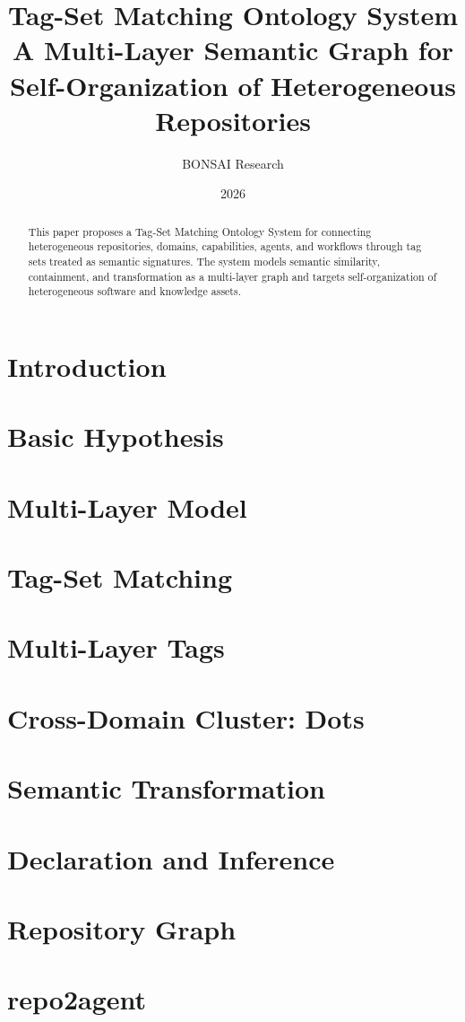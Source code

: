 \documentclass[11pt,a4paper]{article}
\title{Tag-Set Matching Ontology System\\
A Multi-Layer Semantic Graph for Self-Organization of Heterogeneous Repositories}
\author{BONSAI Research}
\date{2026}
\begin{document}
\maketitle

\begin{abstract}
This paper proposes a Tag-Set Matching Ontology System for connecting heterogeneous repositories, domains, capabilities, agents, and workflows through tag sets treated as semantic signatures. The system models semantic similarity, containment, and transformation as a multi-layer graph and targets self-organization of heterogeneous software and knowledge assets.
\end{abstract}

\section{Introduction}
\section{Basic Hypothesis}
\section{Multi-Layer Model}
\section{Tag-Set Matching}
\section{Multi-Layer Tags}
\section{Cross-Domain Cluster: Dots}
\section{Semantic Transformation}
\section{Declaration and Inference}
\section{Repository Graph}
\section{repo2agent}
\end{document}
